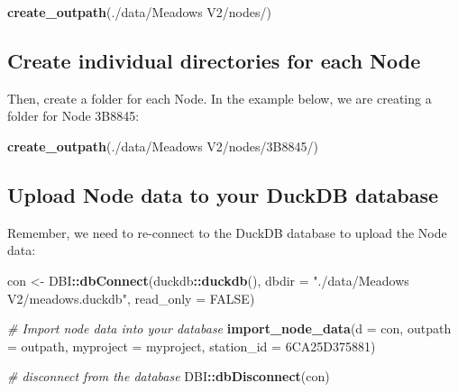 \documentclass[
]{book}
\newenvironment{Shaded}{\begin{snugshade}}{\end{snugshade}}
\newcommand{\AttributeTok}[1]{\textcolor[rgb]{0.13,0.29,0.53}{#1}}
\newcommand{\CommentTok}[1]{\textcolor[rgb]{0.56,0.35,0.01}{\textit{#1}}}
\newcommand{\ConstantTok}[1]{\textcolor[rgb]{0.56,0.35,0.01}{#1}}
\newcommand{\FunctionTok}[1]{\textcolor[rgb]{0.13,0.29,0.53}{\textbf{#1}}}
\newcommand{\NormalTok}[1]{#1}
\newcommand{\OtherTok}[1]{\textcolor[rgb]{0.56,0.35,0.01}{#1}}
\newcommand{\SpecialCharTok}[1]{\textcolor[rgb]{0.81,0.36,0.00}{\textbf{#1}}}
\newcommand{\StringTok}[1]{\textcolor[rgb]{0.31,0.60,0.02}{#1}}
\begin{document}
\begin{Shaded}
\begin{Highlighting}[]
\FunctionTok{create\_outpath}\NormalTok{(}\StringTok{\textquotesingle{}./data/Meadows V2/nodes/\textquotesingle{}}\NormalTok{)}
\end{Highlighting}
\end{Shaded}

\subsection{Create individual directories for each Node}\label{create-individual-directories-for-each-node}

Then, create a folder for each Node. In the example below, we are creating a folder for Node 3B8845:

\begin{Shaded}
\begin{Highlighting}[]
\FunctionTok{create\_outpath}\NormalTok{(}\StringTok{\textquotesingle{}./data/Meadows V2/nodes/3B8845/\textquotesingle{}}\NormalTok{)}
\end{Highlighting}
\end{Shaded}

\subsection{Upload Node data to your DuckDB database}\label{upload-node-data-to-your-duckdb-database}

Remember, we need to re-connect to the DuckDB database to upload the Node data:

\begin{Shaded}
\begin{Highlighting}[]
\NormalTok{con }\OtherTok{\textless{}{-}}\NormalTok{ DBI}\SpecialCharTok{::}\FunctionTok{dbConnect}\NormalTok{(duckdb}\SpecialCharTok{::}\FunctionTok{duckdb}\NormalTok{(), }
                      \AttributeTok{dbdir =} \StringTok{"./data/Meadows V2/meadows.duckdb"}\NormalTok{, }
                      \AttributeTok{read\_only =} \ConstantTok{FALSE}\NormalTok{)}

\CommentTok{\# Import node data into your database}
\FunctionTok{import\_node\_data}\NormalTok{(}\AttributeTok{d =}\NormalTok{ con,}
                 \AttributeTok{outpath =}\NormalTok{ outpath,}
                 \AttributeTok{myproject =}\NormalTok{ myproject,}
                 \AttributeTok{station\_id =} \StringTok{\textquotesingle{}6CA25D375881\textquotesingle{}}\NormalTok{)}

\CommentTok{\# disconnect from the database}
\NormalTok{DBI}\SpecialCharTok{::}\FunctionTok{dbDisconnect}\NormalTok{(con)}
\end{Highlighting}
\end{Shaded}
\end{document}
